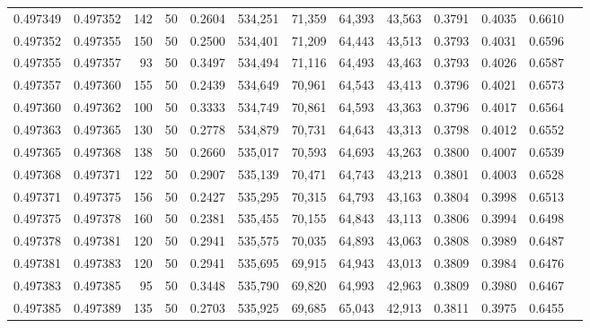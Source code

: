 \begin{tabular}{rrrrrrrrrrrrr}
0.497349 & 0.497352 &   142 &  50 &                                     0.2604 & 534,251 &  71,359 &  64,393 &  43,563 & 0.3791 & 0.4035 & 0.6610 \\
0.497352 & 0.497355 &   150 &  50 &                                     0.2500 & 534,401 &  71,209 &  64,443 &  43,513 & 0.3793 & 0.4031 & 0.6596 \\
0.497355 & 0.497357 &    93 &  50 &                                     0.3497 & 534,494 &  71,116 &  64,493 &  43,463 & 0.3793 & 0.4026 & 0.6587 \\
0.497357 & 0.497360 &   155 &  50 &                                     0.2439 & 534,649 &  70,961 &  64,543 &  43,413 & 0.3796 & 0.4021 & 0.6573 \\
0.497360 & 0.497362 &   100 &  50 &                                     0.3333 & 534,749 &  70,861 &  64,593 &  43,363 & 0.3796 & 0.4017 & 0.6564 \\
0.497363 & 0.497365 &   130 &  50 &                                     0.2778 & 534,879 &  70,731 &  64,643 &  43,313 & 0.3798 & 0.4012 & 0.6552 \\
0.497365 & 0.497368 &   138 &  50 &                                     0.2660 & 535,017 &  70,593 &  64,693 &  43,263 & 0.3800 & 0.4007 & 0.6539 \\
0.497368 & 0.497371 &   122 &  50 &                                     0.2907 & 535,139 &  70,471 &  64,743 &  43,213 & 0.3801 & 0.4003 & 0.6528 \\
0.497371 & 0.497375 &   156 &  50 &                                     0.2427 & 535,295 &  70,315 &  64,793 &  43,163 & 0.3804 & 0.3998 & 0.6513 \\
0.497375 & 0.497378 &   160 &  50 &                                     0.2381 & 535,455 &  70,155 &  64,843 &  43,113 & 0.3806 & 0.3994 & 0.6498 \\
0.497378 & 0.497381 &   120 &  50 &                                     0.2941 & 535,575 &  70,035 &  64,893 &  43,063 & 0.3808 & 0.3989 & 0.6487 \\
0.497381 & 0.497383 &   120 &  50 &                                     0.2941 & 535,695 &  69,915 &  64,943 &  43,013 & 0.3809 & 0.3984 & 0.6476 \\
0.497383 & 0.497385 &    95 &  50 &                                     0.3448 & 535,790 &  69,820 &  64,993 &  42,963 & 0.3809 & 0.3980 & 0.6467 \\
0.497385 & 0.497389 &   135 &  50 &                                     0.2703 & 535,925 &  69,685 &  65,043 &  42,913 & 0.3811 & 0.3975 & 0.6455 \\

\end{tabular}
